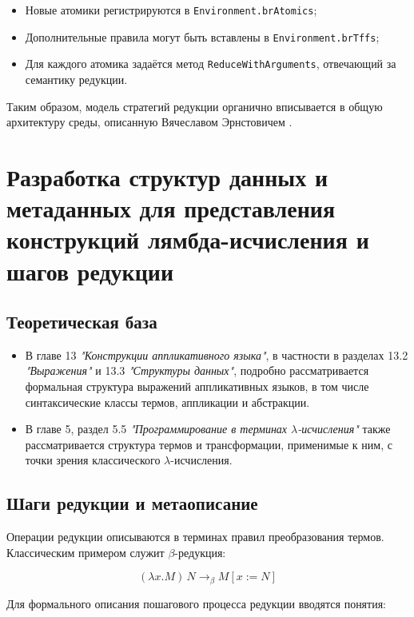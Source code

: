 \begin{itemize}
  \item Новые атомики регистрируются в \verb|Environment.brAtomics|;
  \item Дополнительные правила могут быть вставлены в \verb|Environment.brTffs|;
  \item Для каждого атомика задаётся метод \verb|ReduceWithArguments|, отвечающий за семантику редукции.
\end{itemize}

Таким образом, модель стратегий редукции органично вписывается в общую архитектуру среды, описанную Вячеславом Эрнстовичем \cite{Wolfengagen2004}.

\section{Разработка структур данных и метаданных для представления конструкций лямбда-исчисления и шагов редукции}
\label{sec:lambda-structures}


\subsection*{Теоретическая база}

\begin{itemize}
  \item В главе 13 \textit{"Конструкции аппликативного языка"}, в частности в разделах 13.2 \textit{"Выражения"} и 13.3 \textit{"Структуры данных"}, подробно рассматривается формальная структура выражений аппликативных языков, в том числе синтаксические классы термов, аппликации и абстракции\cite{Wolfengagen2004}.
  \item В главе 5, раздел 5.5 \textit{"Программирование в терминах $\lambda$-исчисления"} также рассматривается структура термов и трансформации, применимые к ним, с точки зрения классического $\lambda$-исчисления\cite{Wolfengagen2004}.
\end{itemize}


\subsection*{Шаги редукции и метаописание}

Операции редукции описываются в терминах правил преобразования термов. Классическим примером служит $\beta$-редукция:

\[
(\lambda x. M) \, N \rightarrow_\beta M[x := N]
\]

Для формального описания пошагового процесса редукции вводятся понятия:

